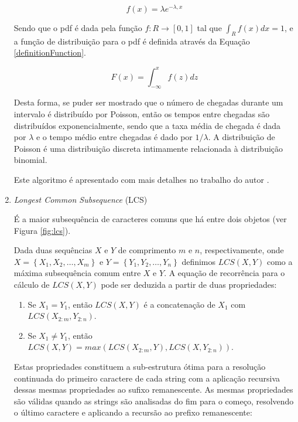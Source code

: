 \begin{enumerate}
    \begin{equation} \label{distribuicaoTempo}
        f(x) = \lambda e^{-\lambda ,x}
    \end{equation}
    
    Sendo que o pdf é dada pela função \({f \colon R \rightarrow [0,1]}\) tal que \({\int_{R}f(x)dx = 1}\), e a função de distribuição para o pdf é definida através da Equação \ref{definitionFunction}.
    
    \begin{equation} \label{definitionFunction}
        F(x) = \int_{-\infty}^{x}f(z)dz
    \end{equation}
    
    Desta forma, se puder ser mostrado que o número de chegadas durante um intervalo é distribuído por Poisson, então os tempos entre chegadas são distribuídos exponencialmente, sendo que a taxa média de chegada é dada por \({\lambda}\) e o tempo médio entre chegadas é dado por \({1/\lambda}\). A distribuição de Poisson é uma distribuição discreta intimamente relacionada à distribuição binomial.
    
    Este algoritmo é apresentado com mais detalhes no trabalho do autor \cite{winton2011}.
    
    \item \textit{Longest Common Subsequence} (LCS)
    
    É a maior subsequência de caracteres comuns que há entre dois objetos (ver Figura \ref{fig:lcs}).
    
    Dada duas sequências \({X}\) e \({Y}\) de comprimento \({m}\) e \({n}\), respectivamente, onde \({}\)
    \({X = \left\{X_{1}, X_{2}, \ldots, X_{m} \right\} }\) e \({Y=\left\{Y_{1}, Y_{2}, \ldots, Y_{n} \right\}}\) definimos \({LCS(X,Y)}\) como a máxima subsequência comum entre \({X}\) e \({Y}\). A equação de recorrência para o cálculo de \({LCS(X,Y)}\) pode ser deduzida a partir de duas propriedades:
    
    \begin{enumerate}
        \item Se \({X_{1}=Y_{1}}\), então \({LCS(X,Y)}\) é a concatenação de \({X_{1}}\) com \({LCS(X_{2:m},Y_{2:n})}\).
        \item Se \({X_{1} \not= Y_{1}}\), então \({LCS(X,Y)=max(LCS(X_{2:m},Y), LCS(X,Y_{2:n}))}\).
    \end{enumerate}

    Estas propriedades constituem a sub-estrutura ótima para a resolução continuada do primeiro caractere de cada string com a aplicação recursiva dessas mesmas propriedades ao sufixo remanescente. As mesmas propriedades são válidas quando as strings são analisadas do fim para o começo, resolvendo o último caractere e aplicando a recursão ao prefixo remanescente:
    

\end{enumerate}
